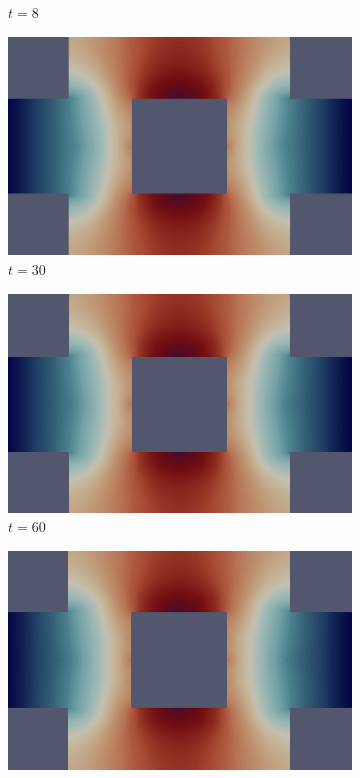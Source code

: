 \begin{figure}[H]
\begin{subfigure}{.4\textwidth}
        \caption{$t = 8$}
    \end{subfigure}
    \begin{subfigure}{.4\textwidth}
        \includegraphics[width=\textwidth]{imgs/HeatSink_Solution/fourth.png}
        \caption{$t = 30$}
    \end{subfigure}
    \begin{subfigure}{.4\textwidth}
        \includegraphics[width=\textwidth]{imgs/HeatSink_Solution/fifth.png}
        \caption{$t = 60$}
    \end{subfigure}
    \begin{subfigure}{.4\textwidth}
        \includegraphics[width=\textwidth]{imgs/HeatSink_Solution/sixth.png}

\end{subfigure}
\end{figure}
